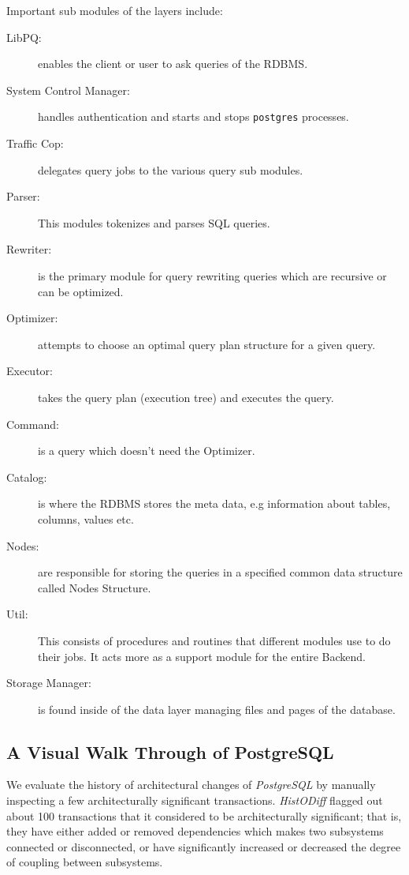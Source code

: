 \documentclass[times, 10pt,twocolumn]{article}
\newcommand{\histodiff}{\emph{HistODiff}\xspace}
\newcommand{\postgresql}{\emph{PostgreSQL}\xspace}
\newcommand{\Subsection}[1]{\subsection{#1}}
\begin{document}
Important sub modules of the layers include:

\begin{description}
\item[LibPQ:] enables the client or user to ask queries of the RDBMS.
\item[System Control Manager:] handles authentication and starts and stops
    \texttt{postgres} processes.
\item[Traffic Cop:] delegates query jobs to the various query sub modules.
\item[Parser:] This modules tokenizes and parses SQL queries.
\item[Rewriter:] is the primary module for query rewriting queries which
    are recursive or can be optimized.
\item[Optimizer:] attempts to choose an optimal query plan structure for a
    given query.
\item[Executor:] takes the query plan (execution tree) and executes the
    query.
\item[Command:] is a query which doesn't need the Optimizer.
\item[Catalog:] is where the RDBMS stores the meta data, e.g information
    about tables, columns, values etc.
\item[Nodes:] are responsible for storing the queries in a specified common
    data structure called Nodes Structure.
\item[Util:] This consists of procedures and routines that different
    modules use to do their jobs. It acts more as a support module for the
    entire Backend.
\item[Storage Manager:] is found inside of the data layer managing files
    and pages of the database.
\end{description}

\Subsection{A Visual Walk Through of PostgreSQL}


We evaluate the history of architectural changes of \postgresql by manually
inspecting a few architecturally significant transactions.  \histodiff
flagged out about 100 transactions that it considered to be architecturally
significant; that is, they have either added or removed dependencies which
makes two subsystems connected or disconnected, or have significantly
increased or decreased the degree of coupling between subsystems.  

\end{document}
